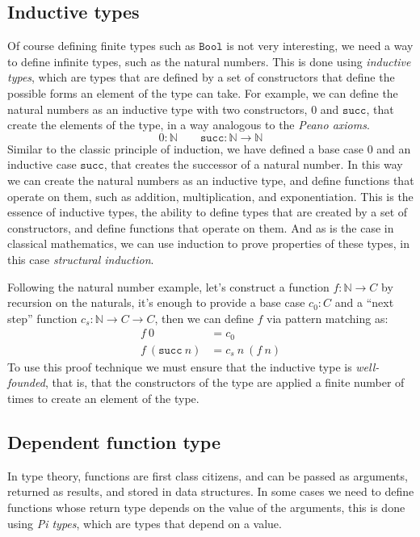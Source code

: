 \documentclass[
  a4paper, 
  10pt, 
  parskip=half, 
  DIV=20,
  toc=bibliography,
  usegeometry,
]{scrartcl}
\begin{document}
\subsection{Inductive types}

Of course defining finite types such as \(\texttt{Bool}\) is not very
interesting, we need a way to define infinite types, such as the natural
numbers. This is done using \emph{inductive types}, which are types that are defined
by a set of constructors that define the possible forms an element of the type
can take. For example, we can define the natural numbers as an inductive type
with two constructors, \(0\) and \(\texttt{succ}\), that create the
elements of the type, in a way analogous to the \emph{Peano axioms}.
\[
0 : \mathbb{N} \qquad
    \texttt{succ}: \mathbb{N} \to \mathbb{N}
\]
Similar to the classic principle of induction, we have defined a base case
\(0\) and an inductive case \(\texttt{succ}\), that creates the
successor of a natural number. In this way we can create the natural numbers as
an inductive type, and define functions that operate on them, such as addition,
multiplication, and exponentiation. This is the essence of inductive types, the
ability to define types that are created by a set of constructors, and define
functions that operate on them. And as is the case in classical mathematics, we
can use induction to prove properties of these types, in this case \emph{structural
induction}.

Following the natural number example, let's construct a function
\(f: \mathbb{N} \to C\) by recursion on the naturals, it's enough to provide a
base case \(c_0 : C\) and a \enquote{next step} function \(c_s: \mathbb{N} \to C \to C\),
then we can define \(f\) via pattern matching as:
\begin{align*}
  f \ 0 & = c_0 \\
  f \ (\texttt{succ} \ n) & = c_s \ n \ (f \ n)
\end{align*}
To use this proof technique we must ensure that the inductive type is
\emph{well-founded}, that is, that the constructors of the type are applied a finite
number of times to create an element of the type.

\subsection{Dependent function type}

In type theory, functions are first class citizens, and can be passed as
arguments, returned as results, and stored in data structures. In some cases we
need to define functions whose return type depends on the value of the
arguments, this is done using \emph{Pi types}, which are types that depend on a
value.
\end{document}
